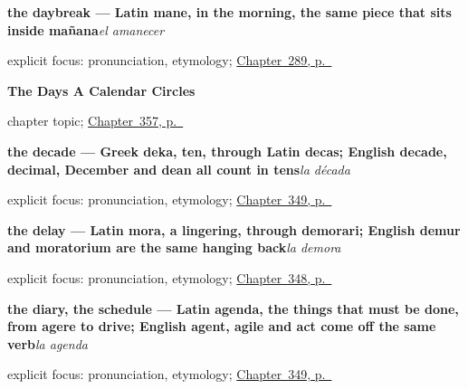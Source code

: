 \noindent\begin{minipage}[t]{\linewidth}
\raggedright
\textbf{the daybreak — Latin mane, in the morning, the same piece that sits inside mañana}\enspace\emph{el amanecer}\par
\footnotesize explicit focus: pronunciation, etymology; \hyperref[ch:lo-de-arriba]{Chapter~289, p.~\pageref*{ch:lo-de-arriba}}
\end{minipage}\par\smallskip

\noindent\begin{minipage}[t]{\linewidth}
\raggedright
\textbf{The Days A Calendar Circles}\par
\footnotesize chapter topic; \hyperref[ch:la-navidad-y-la-pascua]{Chapter~357, p.~\pageref*{ch:la-navidad-y-la-pascua}}
\end{minipage}\par\smallskip

\noindent\begin{minipage}[t]{\linewidth}
\raggedright
\textbf{the decade — Greek deka, ten, through Latin decas; English decade, decimal, December and dean all count in tens}\enspace\emph{la década}\par
\footnotesize explicit focus: pronunciation, etymology; \hyperref[ch:la-jornada-y-la-decada]{Chapter~349, p.~\pageref*{ch:la-jornada-y-la-decada}}
\end{minipage}\par\smallskip

\noindent\begin{minipage}[t]{\linewidth}
\raggedright
\textbf{the delay — Latin mora, a lingering, through demorari; English demur and moratorium are the same hanging back}\enspace\emph{la demora}\par
\footnotesize explicit focus: pronunciation, etymology; \hyperref[ch:el-principio-y-el-fin]{Chapter~348, p.~\pageref*{ch:el-principio-y-el-fin}}
\end{minipage}\par\smallskip

\noindent\begin{minipage}[t]{\linewidth}
\raggedright
\textbf{the diary, the schedule — Latin agenda, the things that must be done, from agere to drive; English agent, agile and act come off the same verb}\enspace\emph{la agenda}\par
\footnotesize explicit focus: pronunciation, etymology; \hyperref[ch:la-jornada-y-la-decada]{Chapter~349, p.~\pageref*{ch:la-jornada-y-la-decada}}
\end{minipage}\par\smallskip

